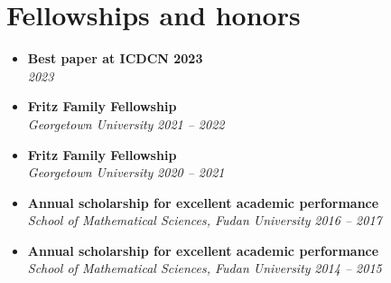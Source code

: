 \documentclass[letterpaper,11pt]{article}
\makeatletter
\newcommand{\resumeSubheading}[4]{
  \vspace{-7pt}\item
      \textbf{#1} \hfill #2 \\
      \textit{\small#3} \hfill \textit{\small #4}
  \vspace{-4pt}
}
\newcommand{\resumeSubHeadingListStart}{\begin{itemize}[leftmargin=*]}
\newcommand{\resumeSubHeadingListEnd}{\end{itemize}}
\makeatother
\begin{document}
\section{Fellowships and honors}
  \resumeSubHeadingListStart
    \resumeSubheading
      {Best paper at ICDCN 2023}{}
      {}{2023}
    \resumeSubheading
      {Fritz Family Fellowship}{}
      {Georgetown University}{2021 -- 2022}
    \resumeSubheading
      {Fritz Family Fellowship}{}
      {Georgetown University}{2020 -- 2021}
    \resumeSubheading
      {Annual scholarship for excellent academic performance}{}
      {School of Mathematical Sciences, Fudan University}{2016 -- 2017}
    \resumeSubheading
      {Annual scholarship for excellent academic performance}{}
      {School of Mathematical Sciences, Fudan University}{2014 -- 2015}
  \resumeSubHeadingListEnd
\end{document}
